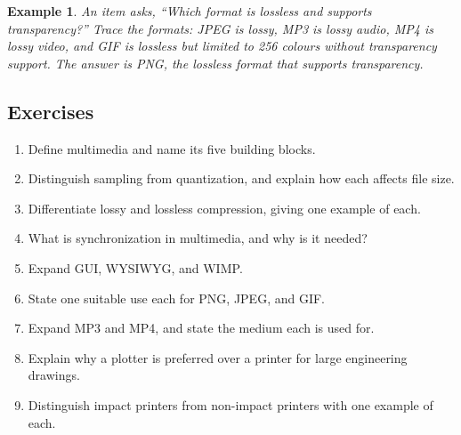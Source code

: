 \documentclass[11pt]{article}
\newtheorem{example}{Example}[section]
\begin{document}
\begin{example}
An item asks, ``Which format is lossless and supports transparency?'' Trace
the formats: JPEG is lossy, MP3 is lossy audio, MP4 is lossy video, and GIF is
lossless but limited to 256 colours without transparency support. The answer
is PNG, the lossless format that supports transparency.
\end{example}

\subsection*{Exercises}
\begin{enumerate}[label=\arabic*.]
  \item Define multimedia and name its five building blocks.
  \item Distinguish sampling from quantization, and explain how each affects
    file size.
  \item Differentiate lossy and lossless compression, giving one example of
    each.
  \item What is synchronization in multimedia, and why is it needed?
  \item Expand GUI, WYSIWYG, and WIMP.
  \item State one suitable use each for PNG, JPEG, and GIF.
  \item Expand MP3 and MP4, and state the medium each is used for.
  \item Explain why a plotter is preferred over a printer for large engineering
    drawings.
  \item Distinguish impact printers from non-impact printers with one example
    of each.
\end{enumerate}
\end{document}
